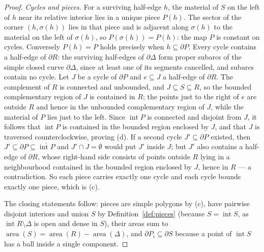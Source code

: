 \documentclass[11pt]{amsart}
\theoremstyle{definition}
\theoremstyle{remark}
\begin{document}
\begin{proof}
\emph{Cycles and pieces.}  For a surviving half-edge $h$, the material of $S$
on the left of $h$ near its relative interior lies in a unique piece $P(h)$.
The sector of the corner $(h,\sigma(h))$ lies in that piece and is adjacent
along $\sigma(h)$ to the material on the left of $\sigma(h)$, so
$P(\sigma(h))=P(h)$: the map $P$ is constant on cycles.  Conversely
$P(h)=P$ holds precisely when $h\subseteq\partial P$.  Every cycle contains a
half-edge of $\partial R$: the surviving half-edges of $\partial\Delta$ form
proper subarcs of the simple closed curve $\partial\Delta$, since at least
one of its segments cancelled, and subarcs contain no cycle.  Let $J$ be a
cycle of $\partial P$ and $e\subseteq J$ a half-edge of $\partial R$.  The
complement of $R$ is connected and unbounded, and $J\subseteq S\subseteq R$,
so the bounded complementary region of $J$ is contained in $R$; the points
just to the right of $e$ are outside $R$ and hence in the unbounded
complementary region of $J$, while the material of $P$ lies just to the left.
Since $\operatorname{int}P$ is connected and disjoint from $J$, it follows
that $\operatorname{int}P$ is contained in the bounded region enclosed by
$J$, and that $J$ is traversed counterclockwise, proving (d).  If a second
cycle $J'\subseteq\partial P$ existed, then
$J'\subseteq\partial P\subseteq\overline{\operatorname{int}P}$ and
$J'\cap J=\emptyset$ would put $J'$ inside $J$; but $J'$ also contains a
half-edge of $\partial R$, whose right-hand side consists of points outside
$R$ lying in a neighbourhood contained in the bounded region enclosed by $J$,
hence in $R$ --- a contradiction.  So each piece carries exactly one cycle
and each cycle bounds exactly one piece, which is (c).

The closing statements follow: pieces are simple polygons by (c), have
pairwise disjoint interiors and union $S$ by Definition~\ref{def:pieces}
(because $S=\overline{\operatorname{int}S}$, as $\operatorname{int}R\setminus
\Delta$ is open and dense in $S$), their areas sum to
$\operatorname{area}(S)=\operatorname{area}(R)-\operatorname{area}(\Delta)$,
and $\partial P_i\subseteq\partial S$ because a point of
$\operatorname{int}S$ has a ball inside a single component.
\end{proof}
\end{document}
